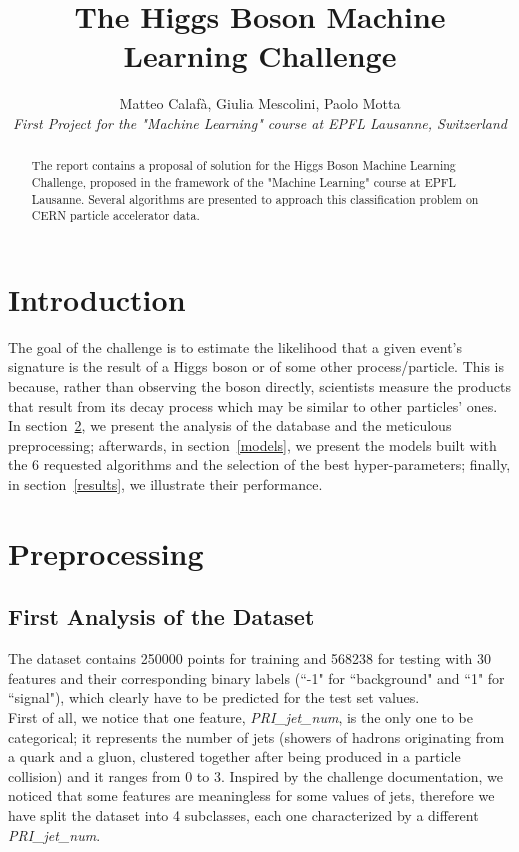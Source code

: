 \documentclass[10pt,conference,compsocconf]{IEEEtran}
\begin{document}
\title{The Higgs Boson Machine Learning Challenge}

\author{
  Matteo Calafà, Giulia Mescolini, Paolo Motta\\
  \textit{First Project for the "Machine Learning" course at EPFL Lausanne, Switzerland}
}

\maketitle

\begin{abstract}
 The report contains a proposal of solution for the Higgs Boson Machine Learning Challenge, proposed in the framework of the "Machine Learning" course at EPFL Lausanne. Several algorithms are presented to approach this classification problem on CERN particle accelerator data.
\end{abstract}

\section{Introduction}

The goal of the challenge is to estimate the likelihood that a given event's signature is the result of a Higgs boson or of some other process/particle. This is because, rather than observing the boson directly, scientists measure the products that result from its decay process which may be similar to other particles' ones. \\
In section~\ref{preprocessing}, we present the analysis of the database and the meticulous preprocessing; afterwards, in section~\ref{models}, we present the models built with the 6 requested algorithms and the selection of the best hyper-parameters; finally, in section~\ref{results}, we illustrate their performance.

\section{Preprocessing}
\label{preprocessing}

\subsection{First Analysis of the Dataset}
\label{categorical}
The dataset contains 250000 points for training and 568238 for testing with 30 features and their corresponding binary labels (``-1" for ``background" and ``1" for ``signal"), which clearly have to be predicted for the test set values. \\
First of all, we notice that one feature, \emph{PRI\_jet\_num}, is the only one to be categorical; it represents the number of jets (showers of hadrons originating from a quark and a gluon, clustered together after being produced in a particle collision) and it ranges from 0 to 3. Inspired by the challenge documentation, we noticed that some features are meaningless for some values of jets, therefore we have split the dataset into 4 subclasses, each one characterized by a different \emph{PRI\_jet\_num}.
\end{document}
